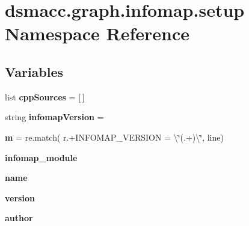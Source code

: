 \hypertarget{namespacedsmacc_1_1graph_1_1infomap_1_1setup}{}\section{dsmacc.\+graph.\+infomap.\+setup Namespace Reference}
\label{namespacedsmacc_1_1graph_1_1infomap_1_1setup}
\subsection*{Variables}
\begin{DoxyCompactItemize}
\item 
\mbox{\label{namespacedsmacc_1_1graph_1_1infomap_1_1setup_aeacfd655b70f7a6b3f54045103a0ef31}} 
list {\bfseries cpp\+Sources} = \mbox{[}$\,$\mbox{]}
\item 
\mbox{\label{namespacedsmacc_1_1graph_1_1infomap_1_1setup_a7c63d6ba440de2236664115d28823768}} 
string {\bfseries infomap\+Version} = \textquotesingle{}\textquotesingle{}
\item 
\mbox{\label{namespacedsmacc_1_1graph_1_1infomap_1_1setup_a93dfc3d458a763fc49b3826d279f1fec}} 
{\bfseries m} = re.\+match( r\textquotesingle{}.+I\+N\+F\+O\+M\+A\+P\+\_\+\+V\+E\+R\+S\+I\+ON = \textbackslash{}\char`\"{}(.+)\textbackslash{}\char`\"{}\textquotesingle{}, line)
\item 
{\bfseries infomap\+\_\+module}
\item 
\mbox{\label{namespacedsmacc_1_1graph_1_1infomap_1_1setup_a789f03ff295865f3c97b7b9d3e958705}} 
{\bfseries name}
\item 
\mbox{\label{namespacedsmacc_1_1graph_1_1infomap_1_1setup_a4a0d22db10efc3674a9e26b54a11d259}} 
{\bfseries version}
\item 
\mbox{\label{namespacedsmacc_1_1graph_1_1infomap_1_1setup_a505d8ebd84e91d392210349b3232c385}} 
{\bfseries author}
\item 
\mbox{\label{namespacedsmacc_1_1graph_1_1infomap_1_1setup_a5442dfe629625b019dae3795b5bbcb4b}} 

\end{DoxyCompactItemize}
